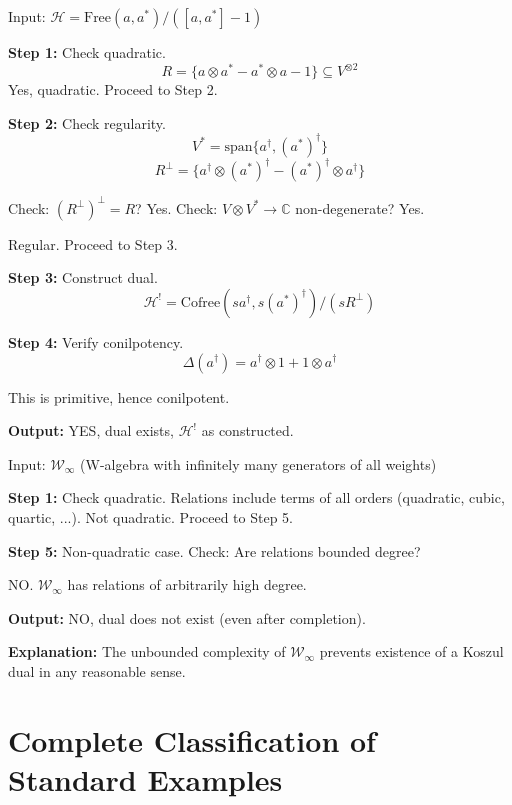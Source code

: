 \begin{example}\label{ex:algorithm-heisenberg}
Input: $\mathcal{H} = \text{Free}(a, a^*) / ([a, a^*] - 1)$

\textbf{Step 1:} Check quadratic. 
$$R = \{a \otimes a^* - a^* \otimes a - 1\} \subseteq V^{\otimes 2}$$
Yes, quadratic. Proceed to Step 2.

\textbf{Step 2:} Check regularity.
$$V^* = \text{span}\{a^{\dagger}, (a^*)^{\dagger}\}$$
$$R^\perp = \{a^{\dagger} \otimes (a^*)^{\dagger} - (a^*)^{\dagger} \otimes a^{\dagger}\}$$

Check: $(R^\perp)^\perp = R$? Yes.
Check: $V \otimes V^* \to \mathbb{C}$ non-degenerate? Yes.

Regular. Proceed to Step 3.

\textbf{Step 3:} Construct dual.
$$\mathcal{H}^! = \text{Cofree}(sa^{\dagger}, s(a^*)^{\dagger}) / (sR^\perp)$$

\textbf{Step 4:} Verify conilpotency.
$$\Delta(a^{\dagger}) = a^{\dagger} \otimes 1 + 1 \otimes a^{\dagger}$$

This is primitive, hence conilpotent.

\textbf{Output:} YES, dual exists, $\mathcal{H}^!$ as constructed.
\end{example}

\begin{example}\label{ex:algorithm-w-infinity}
Input: $\mathcal{W}_\infty$ (W-algebra with infinitely many generators of all weights)

\textbf{Step 1:} Check quadratic.
Relations include terms of all orders (quadratic, cubic, quartic, ...).
Not quadratic. Proceed to Step 5.

\textbf{Step 5:} Non-quadratic case.
Check: Are relations bounded degree? 

NO. $\mathcal{W}_\infty$ has relations of arbitrarily high degree.

\textbf{Output:} NO, dual does not exist (even after completion).

\textbf{Explanation:} The unbounded complexity of $\mathcal{W}_\infty$ prevents 
existence of a Koszul dual in any reasonable sense.
\end{example}


\section{Complete Classification of Standard Examples}
\label{sec:classification-standard-examples}

